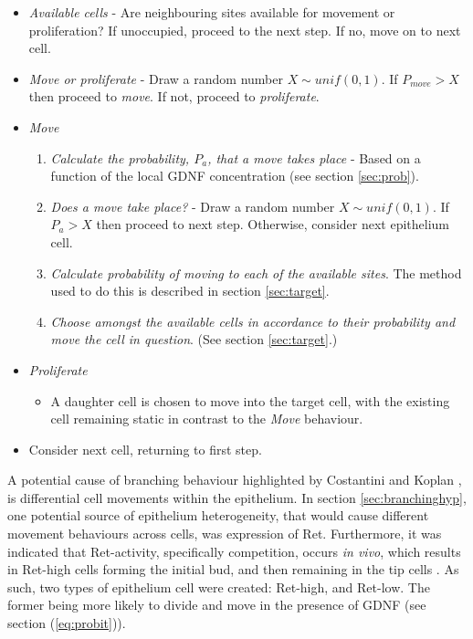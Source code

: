 \documentclass[pdftex,10pt,a4paper,twocolumn]{article}
\begin{document}
\begin{itemize}
\item \textit{Available cells} - Are neighbouring sites available for movement or proliferation? If unoccupied, proceed to the next step. If no, move on to next cell. 
\item \textit{Move or proliferate} - Draw a random number $X\sim unif(0,1)$. If $P_{move}>X$ then proceed to \textit{move}. If not, proceed to \textit{proliferate}.
\item \textit{Move} 
\begin{enumerate}
\item \textit{Calculate the probability, $P_a$, that a move takes place} - Based on a function of the local GDNF concentration (see section \ref{sec:prob}).
\item \textit{Does a move take place?} - Draw a random number $X\sim unif(0,1)$. If $P_{a}>X$ then proceed to next step. Otherwise, consider next epithelium cell.
\item \textit{Calculate probability of moving to each of the available sites}.  The method used to do this is described in section \ref{sec:target}.
\item \textit{Choose amongst the available cells in accordance to their probability and move the cell in question}. (See section \ref{sec:target}.)
\end{enumerate} 
\item \textit{Proliferate}
\begin{itemize}
\item A daughter cell is chosen to move into the target cell, with the existing cell remaining static in contrast to the \textit{Move} behaviour.
\end{itemize}
\item Consider next cell, returning to first step.
\end{itemize}

A potential cause of branching behaviour highlighted by Costantini and Koplan \cite{CostantiniFKopan2010}, is differential cell movements within the epithelium. In section \ref{sec:branchinghyp}, one potential source of epithelium heterogeneity, that would cause different movement behaviours across cells, was expression of Ret. Furthermore, it was indicated that Ret-activity, specifically competition, occurs \textit{in vivo}, which results in Ret-high cells forming the initial bud, and then remaining in the tip cells \cite{Chi2009}. As such, two types of epithelium cell were created: Ret-high, and Ret-low. The former being more likely to divide and move in the presence of GDNF (see section (\ref{eq:probit})).
\end{document}
